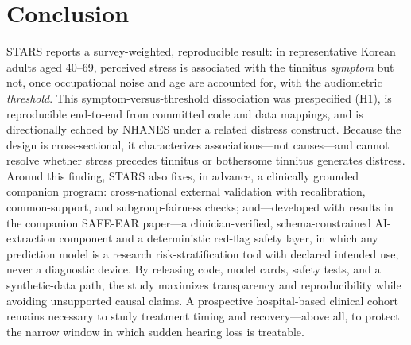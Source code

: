 \section{Conclusion}
STARS reports a survey-weighted, reproducible result: in representative Korean adults aged 40--69, perceived stress is associated with the tinnitus \emph{symptom} but not, once occupational noise and age are accounted for, with the audiometric \emph{threshold}. This symptom-versus-threshold dissociation was prespecified (H1), is reproducible end-to-end from committed code and data mappings, and is directionally echoed by NHANES under a related distress construct. Because the design is cross-sectional, it characterizes associations---not causes---and cannot resolve whether stress precedes tinnitus or bothersome tinnitus generates distress. Around this finding, STARS also fixes, in advance, a clinically grounded companion program: cross-national external validation with recalibration, common-support, and subgroup-fairness checks; and---developed with results in the companion SAFE-EAR paper---a clinician-verified, schema-constrained AI-extraction component and a deterministic red-flag safety layer, in which any prediction model is a research risk-stratification tool with declared intended use, never a diagnostic device. By releasing code, model cards, safety tests, and a synthetic-data path, the study maximizes transparency and reproducibility while avoiding unsupported causal claims. A prospective hospital-based clinical cohort remains necessary to study treatment timing and recovery---above all, to protect the narrow window in which sudden hearing loss is treatable.
